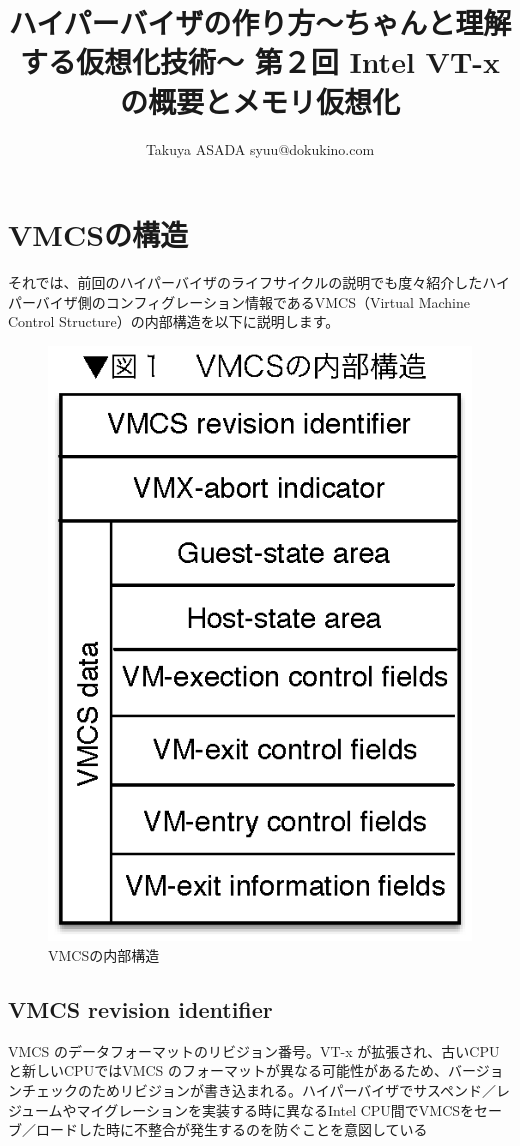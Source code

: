 \documentclass[a4j,12pt]{jarticle}
\title{ハイパーバイザの作り方～ちゃんと理解する仮想化技術～ 第２回 Intel VT-xの概要とメモリ仮想化}
\author{Takuya ASADA syuu@dokukino.com}
\begin{document}
\maketitle

\section{VMCSの構造}
それでは、前回のハイパーバイザのライフサイクルの説明でも度々紹介したハイパーバイザ側のコンフィグレーション情報であるVMCS（Virtual Machine Control Structure）の内部構造を以下に説明します。

\begin{figure}
\includegraphics{figures/part2_fig1.eps}
\caption{VMCSの内部構造}
\label{fig1}
\end{figure}

\subsection*{VMCS revision identifier}
VMCS のデータフォーマットのリビジョン番号。VT-x が拡張され、古いCPUと新しいCPUではVMCS のフォーマットが異なる可能性があるため、バージョンチェックのためリビジョンが書き込まれる。ハイパーバイザでサスペンド／レジュームやマイグレーションを実装する時に異なるIntel CPU間でVMCSをセーブ／ロードした時に不整合が発生するのを防ぐことを意図している
\end{document}
